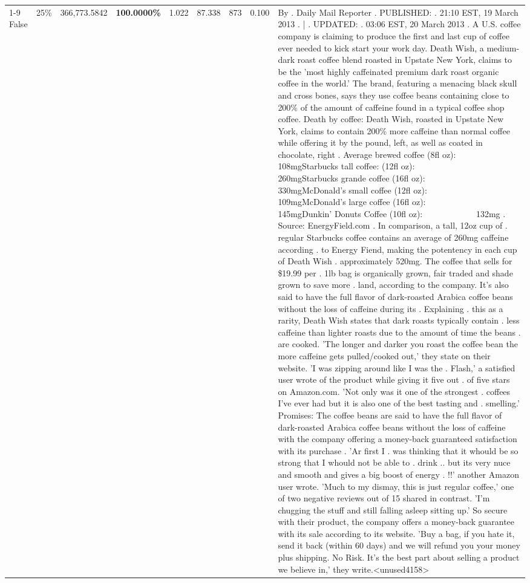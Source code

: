 \begin{table}[H]
{\begin{tabular}{lllrlllll}
\cline{1-9} \cline{2-9}
False & 25\% & 366,773.5842 & \bfseries \color{red} 100.0000\% & 1.022 & 87.338 & 873 & 0.100 & By . Daily Mail Reporter . PUBLISHED: . 21:10 EST, 19 March 2013 . | . UPDATED: . 03:06 EST, 20 March 2013 . A U.S. coffee company is claiming to produce the first and last cup of coffee ever needed to kick start your work day. Death Wish, a medium-dark roast coffee blend roasted in Upstate New York, claims to be the 'most highly caffeinated premium dark roast organic coffee in the world.' The brand, featuring a menacing black skull and cross bones, says they use coffee beans containing close to 200\% of the amount of caffeine found in a typical coffee shop coffee. Death by coffee: Death Wish, roasted in Upstate New York, claims to contain 200\% more caffeine than normal coffee while offering it by the pound, left, as well as coated in chocolate, right . Average brewed coffee (8fl oz):              108mgStarbucks tall coffee: (12fl oz):                260mgStarbucks grande coffee (16fl oz):         330mgMcDonald's small coffee (12fl oz):           109mgMcDonald's large coffee (16fl oz):           145mgDunkin' Donuts Coffee (10fl oz):             132mg . Source: EnergyField.com . In comparison, a tall, 12oz cup of . regular Starbucks coffee contains an average of 260mg caffeine according . to Energy Fiend, making the potentency in each cup of Death Wish . approximately 520mg. The coffee that sells for \$19.99 per . 1lb bag is organically grown, fair traded and shade grown to save more . land, according to the company. It's also said to have the full flavor of dark-roasted Arabica coffee beans without the loss of caffeine during its . Explaining . this as a rarity, Death Wish states that dark roasts typically contain . less caffeine than lighter roasts due to the amount of time the beans . are cooked. 'The longer and darker you roast the coffee bean the more caffeine gets pulled/cooked out,' they state on their website. 'I was zipping around like I was the . Flash,' a satisfied user wrote of the product while giving it five out . of five stars on Amazon.com. 'Not only was it one of the strongest . coffees I've ever had but it is also one of the best tasting and . smelling.’ Promises: The coffee beans are said to have the full flavor of dark-roasted Arabica coffee beans without the loss of caffeine with the company offering a money-back guaranteed satisfaction with its purchase . 'Ar first I . was thinking that it whould be so strong that I whould not be able to . drink .. but its very nuce and smooth and gives a big boost of energy . !!' another Amazon user wrote. 'Much to my dismay, this is just regular coffee,' one of two negative reviews out of 15 shared in contrast. 'I'm chugging the stuff and still falling asleep sitting up.' So secure with their product, the company offers a money-back guarantee with its sale according to its website. 'Buy a bag, if you hate it, send it back (within 60 days) and we will refund you your money plus shipping. No Risk. It’s the best part about selling a product we believe in,' they write.<unused4158> \\

\end{tabular}}
\end{table}
